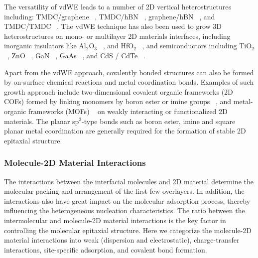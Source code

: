 The versatility of vdWE leads to a number of 2D vertical
heterostructures including: TMDC/graphene
~\cite{Shi_2012_vdw_epi_MoS2_gr,Liu_2016_epi_MoS2_gr_rotation,Lin_2014_vdW_solid,Lin_2015_Wse2_MoS2_gr,Azizi_2015_Freevdw_Gr_TMDCs,Kim_2016_BiSnTe_gr},
TMDC/hBN
~\cite{Yan_2015_MoS2_on_hBN,Wang_2015_cvd_MoS2_BN,Cattelan_2015_Ws2_hBN},
graphene/hBN
~\cite{Liu_2011_gr_hBN,Zhang_2015_gr_hBN,Driver_2016_MBE_gr_hBN}, and
TMDC/TMDC
~\cite{Zhang_2014_vdw_epi_SnS2_MoS2,Diaz_2015_MoTe2_MoSe2,Gong_2014_WS2_MoS2,Alemayehu_2015_TMDC_vdw}.
%
The vdWE technique has also been used to grow 3D heterostructures on
mono- or multilayer 2D materials interfaces, including inorganic
insulators like Al\(_{\text{2}}\)O\(_{\text{3}}\)
~\cite{Zhang_2014_Al2O3_ALO_Gr,Vaziri_2013_ALD_Al2O3_gr}, and
HfO\(_{\text{2}}\) ~\cite{Alaboson_2011_PTCDA_gr_ALD},
%
and semiconductors including TiO\(_{\text{2}}\)
~\cite{Li_2015_TiO2_GO,Kumar_2011_TiO2_piezo_gr,Zhang_2011_TiO2_gr},
ZnO ~\cite{Chung_2010_GaN_ZnO_gr,Oh_2014_ZnO_hBN}, GaN
~\cite{Kobayashi_2012_GaN_hBN,Kim_2014_direct_vdw_GaN_gr,Kim_2017_remote_epi_Gr},
GaAs
~\cite{Alaskar_2015_GaAs_gr_Si_theor,Kim_2017_remote_epi_Gr,Kong_2018_vdw_polar}, and CdS / CdTe
~\cite{Loeher_1994_vdw_epi_CdS_MoTe,Loeher_1996_CdTe_MoWTe}.

Apart from the vdWE approach, covalently bonded structures can also be
formed by on-surface chemical reactions and metal coordination
bonds. Examples of such growth approach include two-dimensional covalent organic frameworks (2D COFs) formed by linking monomers by boron ester
or imine groups
~\cite{Colson_2014_2D_COF_gr,Colson_2011_2DMOF_gr,Sun_2017_COF_VFET}, and metal-organic frameworks (MOFs) ~\cite{Urgel_2015_MOF_BN,Kumar_2014_2D_MOF_gr} on weakly interacting or
functionalized 2D materials. The planar sp$^{2}$-type bonds
such as boron ester, imine and square planar metal coordination are
generally required for the formation of stable 2D epitaxial structure.

\subsubsection{Molecule-2D Material Interactions}
\label{sec:intro-mol-2D}

The interactions between the interfacial molecules and 2D material
determine the molecular packing and arrangement of the first few
overlayers. In addition, the interactions also have great impact on
the molecular adsorption process, thereby influencing the
heterogeneous nucleation characteristics. The
ratio between the intermolecular and molecule-2D material
interactions is the key factor in controlling the molecular epitaxial
structure. Here we categorize the molecule-2D material interactions
into weak (dispersion and electrostatic), charge-transfer
interactions, site-specific adsorption, and covalent bond formation.

